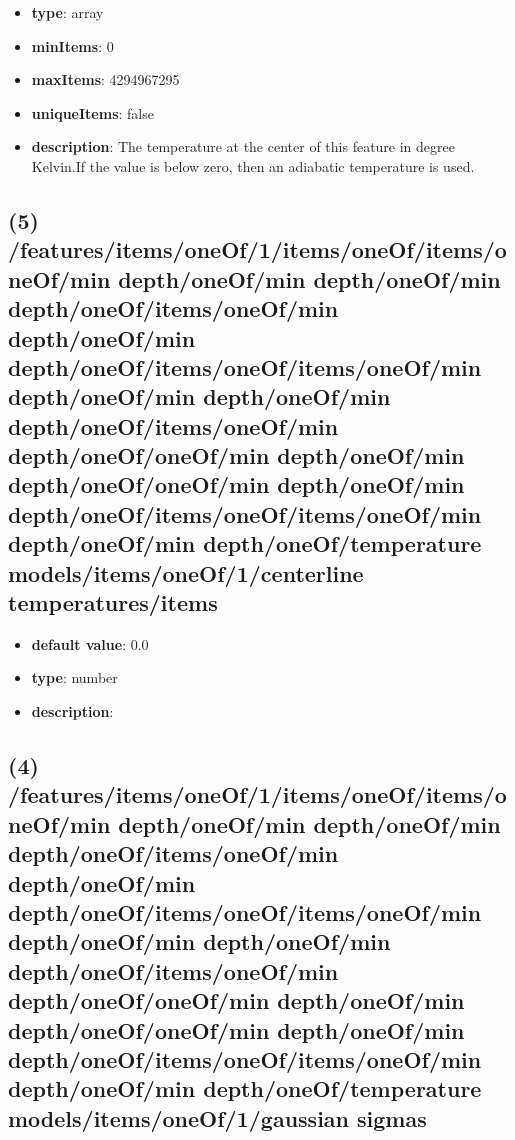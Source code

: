 \begin{itemize}[leftmargin=4em]\item {\bf type}: array
\item {\bf minItems}: 0
\item {\bf maxItems}: 4294967295
\item {\bf uniqueItems}: false
\item {\bf description}: The temperature at the center of this feature in degree Kelvin.If the value is below zero, then an adiabatic temperature is used.
\end{itemize}\subsection{(5) /features/items/oneOf/1/items/oneOf/items/oneOf/min depth/oneOf/min depth/oneOf/min depth/oneOf/items/oneOf/min depth/oneOf/min depth/oneOf/items/oneOf/items/oneOf/min depth/oneOf/min depth/oneOf/min depth/oneOf/items/oneOf/min depth/oneOf/oneOf/min depth/oneOf/min depth/oneOf/oneOf/min depth/oneOf/min depth/oneOf/items/oneOf/items/oneOf/min depth/oneOf/min depth/oneOf/temperature models/items/oneOf/1/centerline temperatures/items}
\begin{itemize}[leftmargin=5em]\item {\bf default value}: 0.0
\item {\bf type}: number
\item {\bf description}: 
\end{itemize}\subsection{(4) /features/items/oneOf/1/items/oneOf/items/oneOf/min depth/oneOf/min depth/oneOf/min depth/oneOf/items/oneOf/min depth/oneOf/min depth/oneOf/items/oneOf/items/oneOf/min depth/oneOf/min depth/oneOf/min depth/oneOf/items/oneOf/min depth/oneOf/oneOf/min depth/oneOf/min depth/oneOf/oneOf/min depth/oneOf/min depth/oneOf/items/oneOf/items/oneOf/min depth/oneOf/min depth/oneOf/temperature models/items/oneOf/1/gaussian sigmas}
